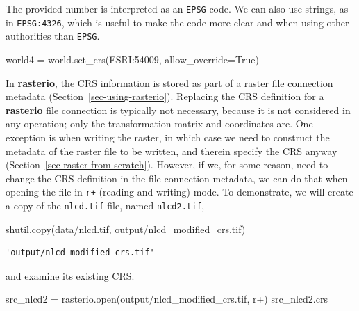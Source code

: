 \documentclass[
  letterpaper,
]{krantz}
\newenvironment{Shaded}{\begin{snugshade}}{\end{snugshade}}
\newcommand{\BuiltInTok}[1]{\textcolor[rgb]{0.00,0.23,0.31}{#1}}
\newcommand{\NormalTok}[1]{\textcolor[rgb]{0.00,0.23,0.31}{#1}}
\newcommand{\OperatorTok}[1]{\textcolor[rgb]{0.37,0.37,0.37}{#1}}
\newcommand{\StringTok}[1]{\textcolor[rgb]{0.13,0.47,0.30}{#1}}
\newcommand{\VariableTok}[1]{\textcolor[rgb]{0.07,0.07,0.07}{#1}}
\begin{document}
The provided number is interpreted as an \texttt{EPSG} code. We can also
use strings, as in
\texttt{\textquotesingle{}EPSG:4326\textquotesingle{}}, which is useful
to make the code more clear and when using other authorities than
\texttt{EPSG}.

\begin{Shaded}
\begin{Highlighting}[]
\NormalTok{world4 }\OperatorTok{=}\NormalTok{ world.set\_crs(}\StringTok{\textquotesingle{}ESRI:54009\textquotesingle{}}\NormalTok{, allow\_override}\OperatorTok{=}\VariableTok{True}\NormalTok{)}
\end{Highlighting}
\end{Shaded}

In \textbf{rasterio}, the CRS information is stored as part of a raster
file connection metadata (Section~\ref{sec-using-rasterio}). Replacing
the CRS definition for a \textbf{rasterio} file connection is typically
not necessary, because it is not considered in any operation; only the
transformation matrix and coordinates are. One exception is when writing
the raster, in which case we need to construct the metadata of the
raster file to be written, and therein specify the CRS anyway
(Section~\ref{sec-raster-from-scratch}). However, if we, for some
reason, need to change the CRS definition in the file connection
metadata, we can do that when opening the file in \texttt{r+} (reading
and writing) mode. To demonstrate, we will create a copy of the
\texttt{nlcd.tif} file, named \texttt{nlcd2.tif},

\begin{Shaded}
\begin{Highlighting}[]
\NormalTok{shutil.copy(}\StringTok{\textquotesingle{}data/nlcd.tif\textquotesingle{}}\NormalTok{, }\StringTok{\textquotesingle{}output/nlcd\_modified\_crs.tif\textquotesingle{}}\NormalTok{)}
\end{Highlighting}
\end{Shaded}

\begin{verbatim}
'output/nlcd_modified_crs.tif'
\end{verbatim}

and examine its existing CRS.

\begin{Shaded}
\begin{Highlighting}[]
\NormalTok{src\_nlcd2 }\OperatorTok{=}\NormalTok{ rasterio.}\BuiltInTok{open}\NormalTok{(}\StringTok{\textquotesingle{}output/nlcd\_modified\_crs.tif\textquotesingle{}}\NormalTok{, }\StringTok{\textquotesingle{}r+\textquotesingle{}}\NormalTok{)}
\NormalTok{src\_nlcd2.crs}
\end{Highlighting}
\end{Shaded}
\end{document}
